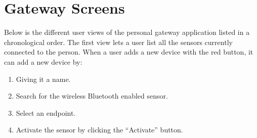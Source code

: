 \section{Gateway Screens} %
\label{sec:gateway_screens}

Below is the different user views of the personal gateway application listed in a chronological order. The first view lets a user list all the sensors currently connected to the person. When a user adds a new device with the red button, it can add a new device by:

\begin{enumerate}

  \item  Giving it a name.
  \item Search for the wireless Bluetooth enabled sensor.
  \item Select an endpoint.
  \item Activate the sensor by clicking the ``Activate'' button.

\end{enumerate}


